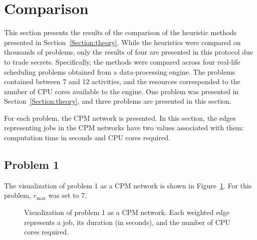 \section{Comparison}
This section presents the results of the comparison of the heuristic methods presented in Section~\ref{Section:theory}.
While the heuristics were compared on thousands of problems, only the results of four are presented in this protocol due to trade secrets.
Specifically, the methods were compared across four real-life scheduling problems obtained from a data-processing engine.
The problems contained between 7 and 12 activities, and the resources corresponded to the number of CPU cores available to the engine.
One problem was presented in Section~\ref{Section:theory}, and three problems are presented in this section.

For each problem, the CPM network is presented.
In this section, the edges representing jobs in the CPM networks have two values associated with them: computation time in seconds and CPU cores required.

\subsection{Problem 1}
The visualization of problem 1 as a CPM network is shown in Figure~\ref{Figure:comparion->problem->1->cpm-network}. For this problem, $r_\mathrm{max}$ was set to 7.

\begin{figure}[ht!]
	\centering
	\caption{Visualization of problem 1 as a CPM network.
		Each weighted edge represents a job, its duration (in seconds), and the number of CPU cores required.
	}
	\label{Figure:comparion->problem->1->cpm-network}
\end{figure}

